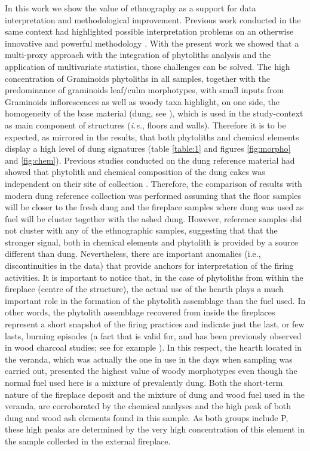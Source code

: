 \documentclass[authoryear,preprint,review,12pt]{elsarticle}
\begin{document}
In this work we show the value of ethnography as a support for data interpretation and methodological improvement. Previous work conducted in the same context had highlighted possible interpretation problems on an otherwise innovative and powerful methodology \citep{Rondelli2014}. With the present work we showed that a multi-proxy approach with the integration of phytoliths analysis and the application of multivariate statistics, those challenges can be solved. The high concentration of Graminoids phytoliths in all samples, together with the predominance of graminoids leaf/culm morphotypes, with small inputs from Graminoids inflorescences as well as woody taxa highlight, on one side, the homogeneity of the base material (dung, see \citealt{Lancelotti2012}), which is used in the study-context as main component of structures (\emph{i.e.}, floors and walls). Therefore it is to be expected, as mirrored in the results, that both phytoliths and chemical elements display a high level of dung signatures (table \ref{table:1} and figures \ref{fig:morpho} and \ref{fig:chem}). Previous studies conducted on the dung reference material had showed that phytolith and chemical composition of the dung cakes was independent on their site of collection \citep{Lancelotti2012}. Therefore, the comparison of results with modern dung reference collection was performed assuming that the floor samples will be closer to the fresh dung and the fireplace samples where dung was used as fuel will be cluster together with the ashed dung. However, reference samples did not cluster with any of the ethnographic samples, suggesting that that the stronger signal, both in chemical elements and phytolith is provided by a source different than dung. Nevertheless, there are important anomalies (i.e., discontinuities in the data) that provide anchors for interpretation of the firing activities. It is important to notice that, in the case of phytoliths from within the fireplace (centre of the structure), the actual use of the hearth plays a much important role in the formation of the phytolith assemblage than the fuel used. In other words, the phytolith assemblage recovered from inside the fireplaces represent a short snapshot of the firing practices and indicate just the last, or few lasts, burning episodes (a fact that is valid for, and has been previously observed in wood charcoal studies; see for example \citealt{Chabal1997}). In this respect, the hearth located in the veranda, which was actually the one in use in the days when sampling was carried out, presented the highest value of woody morphotypes even though the normal fuel used here is a mixture of prevalently dung. Both the short-term nature of the fireplace deposit and the mixture of dung and wood fuel used in the veranda, are corroborated by the chemical analyses and the high peak of both dung and wood ash elements found in this sample. As both groups include P, these high peaks are determined by the very high concentration of this element in the sample collected in the external fireplace.\par
\end{document}

